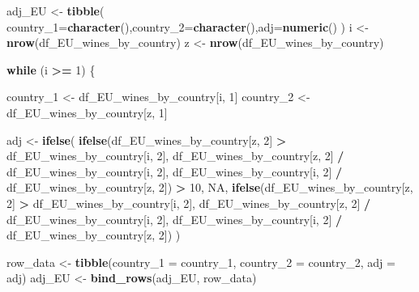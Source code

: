\documentclass[
]{article}
\newenvironment{Shaded}{\begin{snugshade}}{\end{snugshade}}
\newcommand{\AttributeTok}[1]{\textcolor[rgb]{0.13,0.29,0.53}{#1}}
\newcommand{\ConstantTok}[1]{\textcolor[rgb]{0.56,0.35,0.01}{#1}}
\newcommand{\ControlFlowTok}[1]{\textcolor[rgb]{0.13,0.29,0.53}{\textbf{#1}}}
\newcommand{\DecValTok}[1]{\textcolor[rgb]{0.00,0.00,0.81}{#1}}
\newcommand{\FunctionTok}[1]{\textcolor[rgb]{0.13,0.29,0.53}{\textbf{#1}}}
\newcommand{\NormalTok}[1]{#1}
\newcommand{\OtherTok}[1]{\textcolor[rgb]{0.56,0.35,0.01}{#1}}
\newcommand{\SpecialCharTok}[1]{\textcolor[rgb]{0.81,0.36,0.00}{\textbf{#1}}}
\begin{document}
\begin{Shaded}
\begin{Highlighting}[]
\NormalTok{adj\_EU }\OtherTok{\textless{}{-}} \FunctionTok{tibble}\NormalTok{( }\AttributeTok{country\_1=}\FunctionTok{character}\NormalTok{(),}\AttributeTok{country\_2=}\FunctionTok{character}\NormalTok{(),}\AttributeTok{adj=}\FunctionTok{numeric}\NormalTok{()}
\NormalTok{)}
\NormalTok{i }\OtherTok{\textless{}{-}} \FunctionTok{nrow}\NormalTok{(df\_EU\_wines\_by\_country)}
\NormalTok{z }\OtherTok{\textless{}{-}} \FunctionTok{nrow}\NormalTok{(df\_EU\_wines\_by\_country)}


\ControlFlowTok{while}\NormalTok{ (i }\SpecialCharTok{\textgreater{}=} \DecValTok{1}\NormalTok{) \{  }

\NormalTok{  country\_1 }\OtherTok{\textless{}{-}}\NormalTok{ df\_EU\_wines\_by\_country[i, }\DecValTok{1}\NormalTok{]}
\NormalTok{  country\_2 }\OtherTok{\textless{}{-}}\NormalTok{ df\_EU\_wines\_by\_country[z, }\DecValTok{1}\NormalTok{]}

\NormalTok{  adj }\OtherTok{\textless{}{-}} \FunctionTok{ifelse}\NormalTok{(}
    \FunctionTok{ifelse}\NormalTok{(df\_EU\_wines\_by\_country[z, }\DecValTok{2}\NormalTok{] }\SpecialCharTok{\textgreater{}}\NormalTok{ df\_EU\_wines\_by\_country[i, }\DecValTok{2}\NormalTok{],}
\NormalTok{           df\_EU\_wines\_by\_country[z, }\DecValTok{2}\NormalTok{] }\SpecialCharTok{/}\NormalTok{ df\_EU\_wines\_by\_country[i, }\DecValTok{2}\NormalTok{],}
\NormalTok{           df\_EU\_wines\_by\_country[i, }\DecValTok{2}\NormalTok{] }\SpecialCharTok{/}\NormalTok{ df\_EU\_wines\_by\_country[z, }\DecValTok{2}\NormalTok{]) }\SpecialCharTok{\textgreater{}} \DecValTok{10}\NormalTok{,}
    \ConstantTok{NA}\NormalTok{,}
    \FunctionTok{ifelse}\NormalTok{(df\_EU\_wines\_by\_country[z, }\DecValTok{2}\NormalTok{] }\SpecialCharTok{\textgreater{}}\NormalTok{ df\_EU\_wines\_by\_country[i, }\DecValTok{2}\NormalTok{],}
\NormalTok{           df\_EU\_wines\_by\_country[z, }\DecValTok{2}\NormalTok{] }\SpecialCharTok{/}\NormalTok{ df\_EU\_wines\_by\_country[i, }\DecValTok{2}\NormalTok{],}
\NormalTok{           df\_EU\_wines\_by\_country[i, }\DecValTok{2}\NormalTok{] }\SpecialCharTok{/}\NormalTok{ df\_EU\_wines\_by\_country[z, }\DecValTok{2}\NormalTok{])}
\NormalTok{  )}

  
\NormalTok{  row\_data }\OtherTok{\textless{}{-}} \FunctionTok{tibble}\NormalTok{(}\AttributeTok{country\_1 =}\NormalTok{ country\_1, }\AttributeTok{country\_2 =}\NormalTok{ country\_2, }\AttributeTok{adj =}\NormalTok{ adj)}
\NormalTok{  adj\_EU }\OtherTok{\textless{}{-}} \FunctionTok{bind\_rows}\NormalTok{(adj\_EU, row\_data)}


\end{Highlighting}
\end{Shaded}
\end{document}
